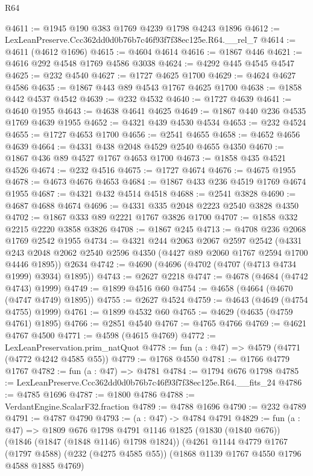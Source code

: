 \begin{lexlean}{R64}
\begin{coremodule}
@4611 := @1945 @190 @383 @1769 @4239 @1798 @4243 @1896
@4612 := LexLeanPreserve.Ccc362dd0d0b76b7c46f93f7f38ec125e.R64.__rel_7
@4614 := @4611 (@4612 @1696)
@4615 := @4604 @4614
@4616 := @1867 @446
@4621 := @4616 @292 @4548 @1769 @4586 @3038
@4624 := @4292 @445 @4545 @4547
@4625 := @232 @4540
@4627 := @1727 @4625 @1700
@4629 := @4624 @4627 @4586
@4635 := @1867 @443 @89 @4543 @1767 @4625 @1700
@4638 := @1858 @442 @4537 @4542
@4639 := @232 @4532
@4640 := @1727 @4639
@4641 := @4640 @1955
@4643 := @4638 @4641 @4625
@4649 := @1867 @440 @236 @4535 @1769 @4639 @1955
@4652 := @4321 @439 @4530 @4534
@4653 := @232 @4524
@4655 := @1727 @4653 @1700
@4656 := @2541 @4655
@4658 := @4652 @4656 @4639
@4664 := @4331 @438 @2048 @4529 @2540 @4655 @4350
@4670 := @1867 @436 @89 @4527 @1767 @4653 @1700
@4673 := @1858 @435 @4521 @4526
@4674 := @232 @4516
@4675 := @1727 @4674
@4676 := @4675 @1955
@4678 := @4673 @4676 @4653
@4684 := @1867 @433 @236 @4519 @1769 @4674 @1955
@4687 := @4321 @432 @4514 @4518
@4688 := @2541 @3828
@4690 := @4687 @4688 @4674
@4696 := @4331 @335 @2048 @2223 @2540 @3828 @4350
@4702 := @1867 @333 @89 @2221 @1767 @3826 @1700
@4707 := @1858 @332 @2215 @2220 @3858 @3826
@4708 := @1867 @245
@4713 := @4708 @236 @2068 @1769 @2542 @1955
@4734 := @4321
    @244
    @2063
    @2067
    @2597
    @2542
    (@4331 @243 @2048 @2062 @2540 @2596 @4350 (@4427 @89 @2060 @1767 @2594 @1700 @4446 @1895))
    @2634
@4742 := @4690 (@4696 (@4702 (@4707 (@4713 @4734 @1999) @3934) @1895))
@4743 := @2627 @2218
@4747 := @4678 (@4684 (@4742 @4743) @1999)
@4749 := @1899 @4516 @60
@4754 := @4658 (@4664 (@4670 (@4747 @4749) @1895))
@4755 := @2627 @4524
@4759 := @4643 (@4649 (@4754 @4755) @1999)
@4761 := @1899 @4532 @60
@4765 := @4629 (@4635 (@4759 @4761) @1895)
@4766 := @2851 @4540
@4767 := @4765 @4766
@4769 := @4621 @4767 @4500
@4771 := @4598 (@4615 @4769)
@4772 := LexLeanPreservation.prim_natQuot
@4778 := fun (a : @47) => @4579 (@4771 (@4772 @4242 @4585 @55))
@4779 := @1768 @4550
@4781 := @1766 @4779 @1767
@4782 := fun (a : @47) => @4781
@4784 := @1794 @676 @1798
@4785 := LexLeanPreserve.Ccc362dd0d0b76b7c46f93f7f38ec125e.R64.__fits_24
@4786 := @4785 @1696
@4787 := @1800 @4786
@4788 := VerdantEngine.ScalarF32.fraction
@4789 := @4788 @1696
@4790 := @232 @4789
@4791 := @4787 @4790
@4793 := (a : @47) -> @4784 @4791
@4829 := fun (a : @47) =>
  @1809
    @676
    @1798
    @4791
    @1146
    @1825
    (@1830 (@1840 @676))
    (@1846 (@1847 (@1848 @1146) @1798 @1824))
    (@4261
      @1144
      @4779
      @1767
      (@1797 @4588)
      (@232 (@4275 @4585 @55))
      (@1868 @1139 @1767 @4550 @1796 @4588 @1885 @4769)

\end{coremodule}
\end{lexlean}
